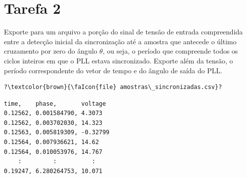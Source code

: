 \section*{Tarefa 2}
Exporte para um arquivo  a porção do sinal de tensão de entrada compreendida entre a detecção
inicial da sincronização até a amostra que antecede o último cruzamento por zero do ângulo $\theta$, ou seja, o período
que compreende todos os ciclos inteiros em que o PLL estava sincronizado.
Exporte além da tensão, o período correspondente do vetor de tempo e do ângulo de saída do PLL.


\pagebreak

\begin{verbatim}
?\textcolor{brown}{\faIcon{file} amostras\_sincronizadas.csv}?
\end{verbatim}
\vspace{-0.8em}
\begin{verbatim}
time,    phase,       voltage
0.12562, 0.001584790, 4.3073
0.12562, 0.003702030, 14.323
0.12563, 0.005819309, -0.32799
0.12564, 0.007936621, 14.62
0.12564, 0.010053976, 14.767
    :         :          :
0.19247, 6.280264753, 10.071
\end{verbatim}


